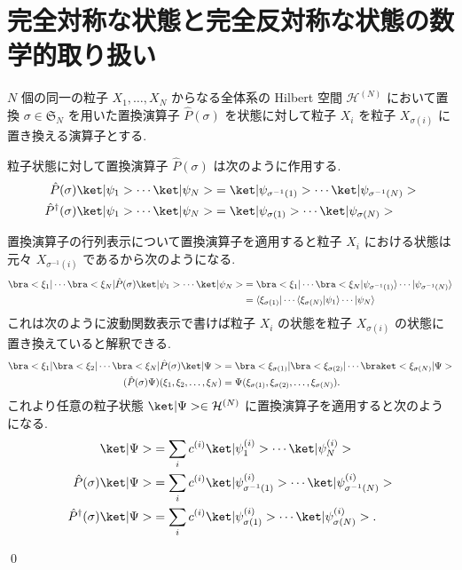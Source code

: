 \documentclass[uplatex,dvipdfmx,a4paper,11pt]{jlreq}
\makeatletter
\newcommand{\HH}{\mathcal{H}}
\renewcommand{\SS}{\mathfrak{S}}
\numberwithin{equation}{section}
\theoremstyle{definition}
\renewenvironment{proof}[1][\proofname]{\par
  \normalfont
  \topsep6\p@\@plus6\p@ \trivlist
  \item[\hskip\labelsep{\bfseries #1}\@addpunct{\bfseries}]\ignorespaces\quad\par
}{
  \qed\endtrivlist\@endpefalse
}
\renewcommand\proofname{証明}
\makeatother
\begin{document}
\section{完全対称な状態と完全反対称な状態の数学的取り扱い}
\begin{definition}[置換演算子]
  $N$ 個の同一の粒子 $X_1,\ldots,X_N$ からなる全体系の Hilbert 空間 $\HH^{(N)}$ において置換 $\sigma\in\SS_N$ を用いた置換演算子 $\hat{P}(\sigma)$ を状態に対して粒子 $X_i$ を粒子 $X_{\sigma(i)}$ に置き換える演算子とする.
\end{definition}

\begin{proposition}[Q21-9, Q21-10(i)(ii)]
  粒子状態に対して置換演算子 $\hat{P}(\sigma)$ は次のように作用する.
  \begin{align}
    \hat{P}(\sigma)\ket|\psi_1>\cdots\ket|\psi_N>         & = \ket|\psi_{\sigma^{-1}(1)}>\cdots\ket|\psi_{\sigma^{-1}(N)}> \\
    \hat{P}^\dagger(\sigma)\ket|\psi_1>\cdots\ket|\psi_N> & = \ket|\psi_{\sigma(1)}>\cdots\ket|\psi_{\sigma(N)}>
  \end{align}
\end{proposition}
\begin{proof}
  置換演算子の行列表示について置換演算子を適用すると粒子 $X_i$ における状態は元々 $X_{\sigma^{-1}(i)}$ であるから次のようになる.
  \begin{align}
    \bra<\xi_1|\cdots\bra<\xi_N|\hat{P}(\sigma)\ket|\psi_1>\cdots\ket|\psi_N> & = \bra<\xi_1|\cdots\bra<\xi_N|\psi_{\sigma^{-1}(1)}\rangle\cdots|\psi_{\sigma^{-1}(N)}\rangle \\
                                                                              & = \langle\xi_{\sigma(1)}|\cdots\langle\xi_{\sigma(N)}|\psi_1\rangle\cdots|\psi_N\rangle
  \end{align}
  これは次のように波動関数表示で書けば粒子 $X_i$ の状態を粒子 $X_{\sigma(i)}$ の状態に置き換えていると解釈できる.
  \begin{align}
    \bra<\xi_1|\bra<\xi_2|\cdots\bra<\xi_N|\hat{P}(\sigma)\ket|\Psi> & = \bra<\xi_{\sigma(1)}|\bra<\xi_{\sigma(2)}|\cdots\braket<\xi_{\sigma(N)}|\Psi> \\
    (\hat{P}(\sigma)\Psi)(\xi_1,\xi_2,\ldots,\xi_N)                  & = \Psi(\xi_{\sigma(1)},\xi_{\sigma(2)},\ldots,\xi_{\sigma(N)}).
  \end{align}
  これより任意の粒子状態 $\ket|\Psi>\in\HH^{(N)}$ に置換演算子を適用すると次のようになる.
  \begin{align}
    \ket|\Psi>                        & = \sum_{i}c^{(i)}\ket|\psi_1^{(i)}>\cdots\ket|\psi_N^{(i)}>                               \\
    \hat{P}(\sigma)\ket|\Psi>         & = \sum_{i}c^{(i)}\ket|\psi_{\sigma^{-1}(1)}^{(i)}>\cdots\ket|\psi_{\sigma^{-1}(N)}^{(i)}> \\
    \hat{P}^\dagger(\sigma)\ket|\Psi> & = \sum_{i}c^{(i)}\ket|\psi_{\sigma(1)}^{(i)}>\cdots\ket|\psi_{\sigma(N)}^{(i)}>.
  \end{align}
\end{proof}
\end{document}
